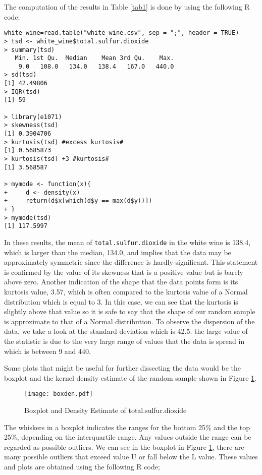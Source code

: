 \documentclass[11pt,a4]{article}
\begin{document}
The computation of the results in Table \ref{tab1} is done by using the following R code: 

\begin{verbatim}
white_wine=read.table("white_wine.csv", sep = ";", header = TRUE)
> tsd <- white_wine$total.sulfur.dioxide
> summary(tsd)
   Min. 1st Qu.  Median    Mean 3rd Qu.    Max. 
    9.0   108.0   134.0   138.4   167.0   440.0 
> sd(tsd)
[1] 42.49806
> IQR(tsd)
[1] 59

> library(e1071)
> skewness(tsd)
[1] 0.3904706
> kurtosis(tsd) #excess kurtosis#
[1] 0.5685873
> kurtosis(tsd) +3 #kurtosis#
[1] 3.568587

> mymode <- function(x){
+     d <- density(x)
+     return(d$x[which(d$y == max(d$y))])
+ }
> mymode(tsd)
[1] 117.5997
\end{verbatim}

In these results, the mean of \verb|total.sulfur.dioxide| in the white wine is 138.4, which is larger than the median, 134.0, and implies that the data may be approximately symmetric since the difference is hardly significant. This statement is confirmed by the value of its skewness that is a positive value but is barely above zero. Another indication of the shape that the data points form is its kurtosis value, 3.57, which is often compared to the kurtosis value of  a Normal distribution which is equal to 3. In this case, we can see that the kurtosis is slightly above that value so it is safe to say that the shape of our random sample is approximate to that of a Normal distribution. To observe the dispersion of the data, we take a look at the standard deviation which is 42.5. the large value of the statistic is due to the very large range of values that the data is spread in which is between 9 and 440. 

\bigskip

Some plots that might be useful for further dissecting the data would be the boxplot and the kernel density estimate of the random sample shown in Figure \ref{fig1}.

\begin{figure}[hbt!]
    \centering
    \texttt{[image: boxden.pdf]}
    \caption{Boxplot and Density Estimate of total.sulfur.dioxide}
    \label{fig1}
\end{figure}

The whiskers in a boxplot indicates the ranges for the bottom 25\% and the top 25\%, depending on the interquartile range. Any values outside the range can be regarded as possible outliers. We can see in the boxplot in Figure \ref{fig1}, there are many possible outliers that exceed value U or fall below the L value. These values and plots are obtained using the following R code;
\end{document}
